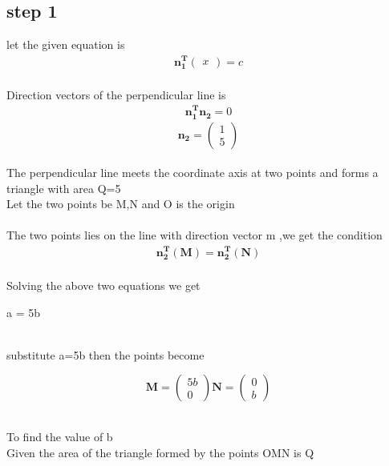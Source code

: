 \documentclass[10pt, a4paper]{article}
\newcommand{\myvec}[1]{\ensuremath{\begin{pmatrix}#1\end{pmatrix}}}
\let\vec\mathbf
\begin{document}
\subsection*{\large step 1}
let the given equation is 
\begin{eqnarray}
	\vec{n_1^T}\myvec{x}=c
\end{eqnarray}
\\Direction vectors of the perpendicular line is
\begin{eqnarray}                                   \vec{n_1^T}\vec{n_2}=0              
\end{eqnarray}
\begin{equation}
\vec{n_2}=\myvec{1\\5}
\end{equation}
\\The  perpendicular line meets the coordinate axis at two points and forms a triangle with area Q=5
\\
Let the two points be M,N and O is the origin
\\
\\The two points lies on the line with direction vector m ,we get the condition
\begin{eqnarray}
\vec{n_2^T\vec{(M)}}=\vec{n_2^T\vec{(N)}}
\end{eqnarray}
\\Solving the above two equations we get
\begin{center}
a = 5b
\end{center}
\
\\substitute a=5b then the points become
\begin{center}
\begin{equation}
\vec{M}=\myvec{5b\\0} \vec{N}=\myvec{0\\b}
\end{equation}
\end{center} 
\
\\To find the value of b
\\Given the area of the triangle formed by the points OMN is Q
\end{document}
